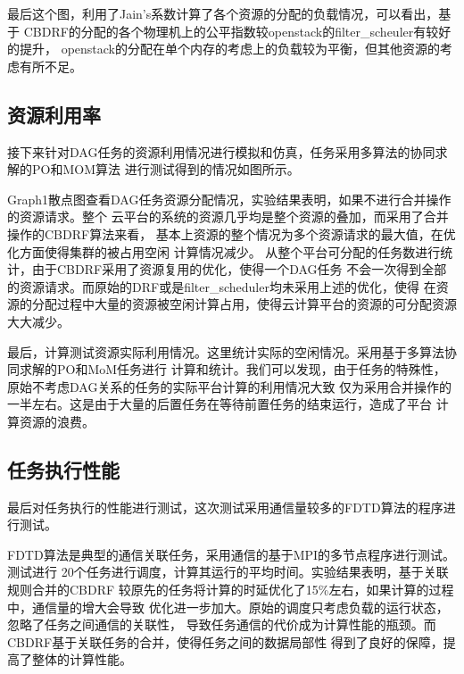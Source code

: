 最后这个图，利用了Jain's系数计算了各个资源的分配的负载情况，可以看出，基于
CBDRF的分配的各个物理机上的公平指数较openstack的filter\_scheuler有较好的提升，
openstack的分配在单个内存的考虑上的负载较为平衡，但其他资源的考虑有所不足。

\subsection{资源利用率}
接下来针对DAG任务的资源利用情况进行模拟和仿真，任务采用多算法的协同求解的PO和MOM算法
进行测试得到的情况如图所示。

Graph1散点图查看DAG任务资源分配情况，实验结果表明，如果不进行合并操作的资源请求。整个
云平台的系统的资源几乎均是整个资源的叠加，而采用了合并操作的CBDRF算法来看，
基本上资源的整个情况为多个资源请求的最大值，在优化方面使得集群的被占用空闲
计算情况减少。
从整个平台可分配的任务数进行统计，由于CBDRF采用了资源复用的优化，使得一个DAG任务
不会一次得到全部的资源请求。而原始的DRF或是filter\_scheduler均未采用上述的优化，使得
在资源的分配过程中大量的资源被空闲计算占用，使得云计算平台的资源的可分配资源大大减少。

最后，计算测试资源实际利用情况。这里统计实际的空闲情况。采用基于多算法协同求解的PO和MoM任务进行
计算和统计。我们可以发现，由于任务的特殊性，原始不考虑DAG关系的任务的实际平台计算的利用情况大致
仅为采用合并操作的一半左右。这是由于大量的后置任务在等待前置任务的结束运行，造成了平台
计算资源的浪费。

\subsection{任务执行性能}
最后对任务执行的性能进行测试，这次测试采用通信量较多的FDTD算法的程序进行测试。

FDTD算法是典型的通信关联任务，采用通信的基于MPI的多节点程序进行测试。测试进行
20个任务进行调度，计算其运行的平均时间。实验结果表明，基于关联规则合并的CBDRF
较原先的任务将计算的时延优化了15\%左右，如果计算的过程中，通信量的增大会导致
优化进一步加大。原始的调度只考虑负载的运行状态，忽略了任务之间通信的关联性，
导致任务通信的代价成为计算性能的瓶颈。而CBDRF基于关联任务的合并，使得任务之间的数据局部性
得到了良好的保障，提高了整体的计算性能。

